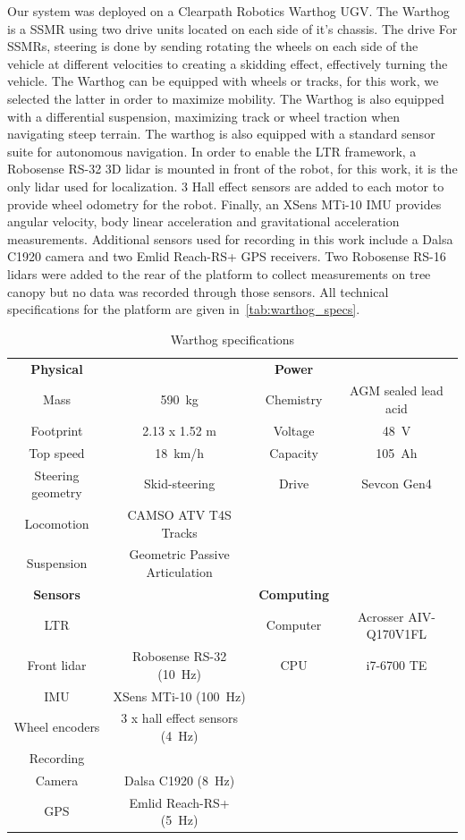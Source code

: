 Our system was deployed on a Clearpath Robotics Warthog \ac{UGV}. 
The Warthog is a \ac{SSMR} using two drive units located on each side of it's chassis. 
The drive
For \acp{SSMR}, steering is done by sending rotating the wheels on each side of the vehicle at different velocities to creating a skidding effect, effectively turning the vehicle.
The Warthog can be equipped with wheels or tracks, for this work, we selected the latter in order to maximize mobility. 
The Warthog is also equipped with a differential suspension, maximizing track or wheel traction when navigating steep terrain.
The warthog is also equipped with a standard sensor suite for autonomous navigation. 
In order to enable the \ac{LTR} framework, a Robosense RS-32 3D lidar is mounted in front of the robot, for this work, it is the only lidar used for localization.
3 Hall effect sensors are added to each motor to provide wheel odometry for the robot. 
Finally, an XSens MTi-10 \ac{IMU} provides angular velocity, body linear acceleration and gravitational acceleration measurements. 
Additional sensors used for recording in this work include a Dalsa C1920 camera and two Emlid Reach-RS+ \ac{GPS} receivers.
Two Robosense RS-16 lidars were added to the rear of the platform to collect measurements on tree canopy but no data was recorded through those sensors. 
All technical specifications for the platform are given in~\autoref{tab:warthog_specs}.

\begin{table}[htpb]
	\caption{Warthog specifications} \label{tab:warthog_specs}
	\begin{center}
		\begin{tabular}{c c c c}
			\textbf{Physical} &  & \textbf{Power} & \\
			Mass & \SI{590}{kg} & Chemistry & AGM sealed lead acid \\ 
			Footprint & 2.13 x 1.52 m & Voltage & \SI{48}{V} \\ 
			Top speed & \SI{18}{km/h} & Capacity & \SI{105}{Ah} \\ 
			Steering geometry & Skid-steering  & Drive & Sevcon Gen4 \\
			Locomotion & CAMSO ATV T4S Tracks \\
			Suspension & Geometric Passive Articulation \\
			\textbf{Sensors} & & \textbf{Computing} \\
			\ac{LTR} & & Computer & Acrosser AIV-Q170V1FL  \\
			Front lidar & Robosense RS-32 (\SI{10}{Hz}) & CPU & i7-6700 TE \\
			\ac{IMU} & XSens MTi-10 (\SI{100}{Hz}) \\ 
			Wheel encoders & 3 x hall effect sensors (\SI{4}{Hz}) \\
			Recording & &   \\
			Camera & Dalsa C1920 (\SI{8}{Hz})  \\
			\ac{GPS} & Emlid Reach-RS+ (\SI{5}{Hz}) \\
		\end{tabular}
	\end{center}
\end{table}


